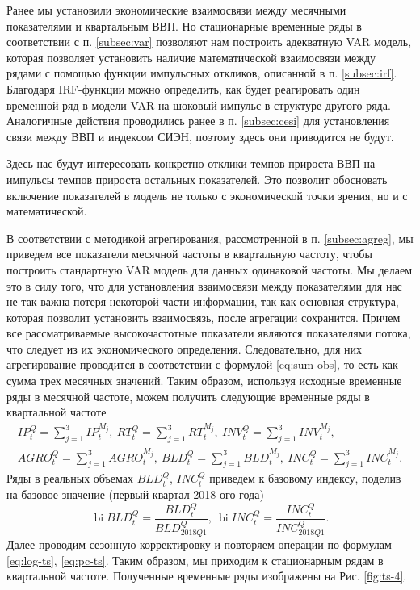 \documentclass[a4paper, 14pt]{extreport}
\numberwithin{equation}{section}
\newcommand{\bi}{\operatorname{bi}}
\numberwithin{equation}{section}
\begin{document}
	Ранее мы установили экономические взаимосвязи между месячными показателями и квартальным ВВП. Но стационарные временные ряды в соответствии с п. \ref{subsec:var} позволяют нам построить адекватную VAR модель, которая позволяет установить наличие математической взаимосвязи между рядами с помощью функции импульсных откликов, описанной в п. \ref{subsec:irf}. Благодаря IRF-функции можно определить, как будет реагировать один временной ряд в модели VAR на шоковый импульс в структуре другого ряда. Аналогичные действия проводились ранее в п. \ref{subsec:cesi} для установления связи между ВВП и индексом СИЭН, поэтому здесь они приводится не будут.
	
	Здесь нас будут интересовать конкретно отклики темпов прироста ВВП на импульсы темпов прироста остальных показателей. Это позволит обосновать включение показателей в модель не только с экономической точки зрения, но и с математической.
	
	В соответствии с методикой агрегирования, рассмотренной в п. \ref{subsec:agreg}, мы приведем все показатели месячной частоты в квартальную частоту, чтобы построить стандартную VAR модель для данных одинаковой частоты. Мы делаем это в силу того, что для установления взаимосвязи между показателями для нас не так важна потеря некоторой части информации, так как основная структура, которая позволит установить взаимосвязь, после агрегации сохранится.
	Причем все рассматриваемые высокочастотные показатели являются показателями потока, что следует из их экономического определения. Следовательно, для них агрегирование проводится в соответствии с формулой \eqref{eq:sum-obs}, то есть как сумма трех месячных значений. Таким образом, используя исходные временные ряды в месячной частоте, можем получить следующие временные ряды в квартальной частоте
	\begin{equation}
		\begin{gathered}
			IP_t^{Q} = \sum_{j=1}^3 IP_t^{M_j},\ RT_t^{Q} = \sum_{j=1}^3 RT_t^{M_j},\ INV_t^{Q} = \sum_{j=1}^3 INV_t^{M_j},\\
			AGRO_t^{Q} = \sum_{j=1}^3 AGRO_t^{M_j},\ BLD_t^{Q} = \sum_{j=1}^3 BLD_t^{M_j},\ INC_t^{Q} = \sum_{j=1}^3 INC_t^{M_j}.
		\end{gathered}
	\end{equation}
	Ряды в реальных объемах $BLD_t^{Q}$, $INC_t^{Q}$ приведем к базовому индексу, поделив на базовое значение (первый квартал 2018-ого года)
	\begin{equation}
		\bi BLD_t^{Q} = \dfrac{BLD_t^{Q}}{BLD_{2018Q1}^{Q}},\ \bi INC_t^{Q} = \dfrac{INC_t^{Q}}{INC_{2018Q1}^{Q}}.
	\end{equation}
	Далее проводим сезонную корректировку и повторяем операции по формулам \eqref{eq:log-ts}, \eqref{eq:pc-ts}.
	Таким образом, мы приходим к стационарным рядам в квартальной частоте. Полученные временные ряды изображены на Рис. \ref{fig:ts-4}.
	
\end{document}
